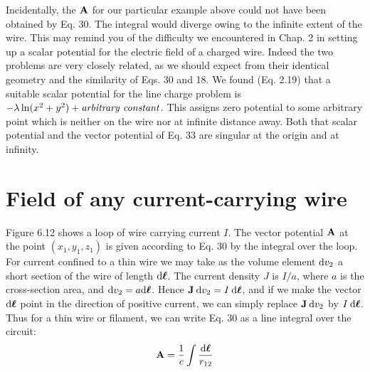 Incidentally, the $\mathbf{A}$ for our particular example above could not
have been obtained by Eq. 30. The integral would diverge owing to
the infinite extent of the wire. This may remind you of the difficulty
we encountered in Chap. 2 in setting up a scalar potential for the
electric field of a charged wire. Indeed the two problems are very
closely related, as we should expect from their identical geometry
and the similarity of Eqs. 30 and 18. We found (Eq. 2.19) that a suitable
scalar potential for the line charge problem
is $-\lambda\ln(x^2+y^2)+\text{\emph{arbitrary constant}}$.
This assigns zero potential to some arbitrary
point which is neither on the wire nor at infinite distance away. Both
that scalar potential and the vector potential of Eq. 33 are singular
at the origin and at infinity.


\section{Field of any current-carrying wire}

Figure 6.12 shows a loop of wire carrying current $I$. The vector
potential $\mathbf{A}$ at the point $(x_1,y_1,z_1)$ is given according to Eq. 30 by the
integral over the loop. For current confined to a thin wire we may
take as the volume element $\textup{d} v_2$ a short section of the wire of length $\textup{d}\boldsymbol{\ell}$.
The current density $J$ is $I/a$, where $a$ is the cross-section area, and
$\textup{d} v_2 = a \textup{d}\boldsymbol{\ell}$. Hence $\mathbf{J}\: \textup{d} v_2 = I\: \textup{d}\boldsymbol{\ell}$, and if 
we make the vector $\textup{d}\boldsymbol{\ell}$ point
in the direction of positive current, we can simply replace $\mathbf{J}\: \textup{d} v_2$ by
$I\: \textup{d}\boldsymbol{\ell}$. Thus for a thin wire or filament, we can write Eq. 30 as a line
integral over the circuit:
\begin{equation}
  \mathbf{A} = \frac{1}{c} \int \frac{\textup{d}\boldsymbol{\ell}}{r_{12}}
\end{equation}

